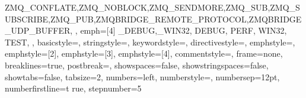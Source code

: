{{		ZMQ_CONFLATE,ZMQ_NOBLOCK,ZMQ_SENDMORE,ZMQ_SUB,ZMQ_SUBSCRIBE,ZMQ_PUB,ZMQBRIDGE_REMOTE_PROTOCOL,ZMQBRIDGE_UDP_BUFFER,
	},
	emph={[4]
		_DEBUG,_WIN32,
		DEBUG,
		PERF,
		WIN32,
		TEST,
	},
	basicstyle=\FONTsizetwo\FONTmonospaceseries,
	stringstyle=,
	keywordstyle=,
	directivestyle={},
	emphstyle=,
	emphstyle={[2]},
	emphstyle={[3]},
	emphstyle={[4]},
	commentstyle=,
	frame=none,
	breaklines=true,
	postbreak=,
	showspaces=false,
	showstringspaces=false,
	showtabs=false,
	tabsize=2,
	numbers=left,
	numberstyle=\FONTsizeone{},
	numbersep=12pt,
	numberfirstline=t rue,
	stepnumber=5
}


\SIUNITXnewunit{}
\SIUNITXnewunit{}


\renewcommand\tabularxcolumn[1]{m{#1}}



\TITLESECformat{\part}{\FLOATcenter\FONTnormalseries\FONTsizenine\FONTboldseries}{\FONTuppercaseseries{\TITLESECname~\TITLESECpart}}{0pt}{\\\FLOATverticalspace{2pc}}


\renewcommand{\cftdot}{}


\renewcommand{\UrlFont}{\FONTmonospace\FONTsizetwo}


